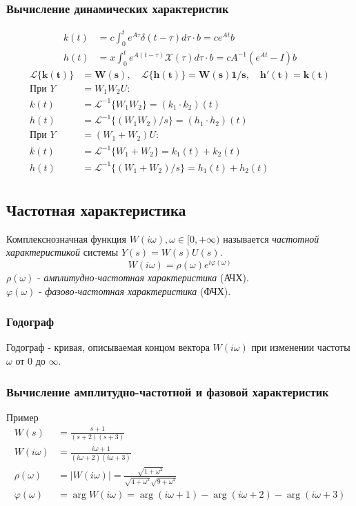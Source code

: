 \documentclass[A4]{article}
\begin{document}
\subsubsection{Вычисление динамических характеристик}
\begin{equation}
\begin{aligned}
k(t)&=c\int_{0}^{t}e^{A\tau}\delta(t-\tau)d\tau\cdot b=ce^{At}b\\
h(t)&=x\int_{0}^{t}e^{A(t-\tau)}\mathcal{X}(\tau)d\tau\cdot b=cA^{-1}(e^{At}-I)b
\end{aligned}
\end{equation}
\begin{equation}
\begin{aligned}
\bm{\mathcal{L}\{k(t)\}}&=\bm{W(s),\quad \mathcal{L}\{h(t)\}=W(s)1/s,\quad h'(t)=k(t)}\\
\text{При }Y&=W_1W_2U:\\
k(t)&=\mathcal{L}^{-1}\{W_1W_2\}=(k_1\cdot k_2)(t)\\
h(t)&=\mathcal{L}^{-1}\{(W_1W_2)/s\}=(h_1\cdot h_2)(t)\\
\text{При }Y&=(W_1+W_2)U:\\
k(t)&=\mathcal{L}^{-1}\{W_1+W_2\}=k_1(t)+ k_2(t)\\
h(t)&=\mathcal{L}^{-1}\{(W_1+W_2)/s\}=h_1(t)+h_2(t)\\
\end{aligned}
\end{equation}
\subsection{Частотная характеристика}
Комплекснозначная функция $W(i\omega),\omega\in[0,+\infty)$ называется \emph{частотной характеристикой} системы $Y(s)=W(s)U(s)$.
\begin{equation}
W(i\omega)=\rho(\omega)e^{i\varphi(\omega)}
\end{equation}
$\rho(\omega)$ - \emph{амплитудно-частотная характеристика} (АЧХ).\\
$\varphi(\omega)$ - \emph{фазово-частотная характеристика} (ФЧХ).\\
\subsubsection{Годограф}
Годограф - кривая, описываемая концом вектора $W(i\omega)$ при изменении частоты $\omega$ от $0$ до $\infty$.  
\subsubsection{Вычисление амплитудно-частотной и фазовой характеристик}
Пример
\begin{equation}
\begin{aligned}
W(s)&=\frac{s+1}{(s+2)(s+3)}\\
W(i\omega)&=\frac{i\omega +1}{(i\omega +2)(i\omega +3)}\\
\rho(\omega)&=|W(i\omega)|=\frac{\sqrt{1+\omega^2}}{\sqrt{4+\omega^2}\sqrt{9+\omega^2}}\\
\varphi(\omega)&=\arg W(i\omega)=\arg (i\omega+1)-\arg(i\omega+2)-\arg(i\omega+3)
\end{aligned}
\end{equation}
\end{document}
